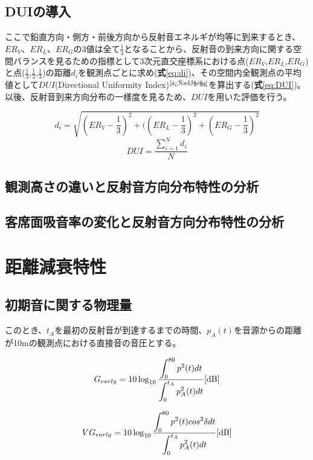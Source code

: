 \subsection{DUIの導入}
ここで鉛直方向・側方・前後方向から反射音エネルギが均等に到来するとき、$ER_V$、$ER_L$、$ER_G$の3値は全て$\frac{1}{3}$となることから、反射音の到来方向に関する空間バランスを見るための指標として3次元直交座標系における点($ER_V$,$ER_L$,$ER_G$)と点($\frac{1}{3}$,$\frac{1}{3}$,$\frac{1}{3}$)の距離$d_i$を観測点ごとに求め(\textbf{式}\ref{eq:di})、その空間内全観測点の平均値として$DUI$(Directional Uniformity Index)$^{\text{\cite{後期音}}}$を算出する(\textbf{式}\ref{eq:DUI})。以後、反射音到来方向分布の一様度を見るため、$DUI$を用いた評価を行う。

\begin{equation}
  \label{eq:di}
  d_i = \sqrt{\left({ER_V-\frac{1}{3}}\right)^2 + (\left(ER_L-\frac{1}{3}\right)^2 + \left(ER_G-\frac{1}{3}\right)^2} 
\end{equation}
\begin{equation}
    \label{eq:DUI}
    DUI=\frac{\sum_{i=1}^N{d_i}}{N}
\end{equation}

\subsection{観測高さの違いと反射音方向分布特性の分析}

\subsection{客席面吸音率の変化と反射音方向分布特性の分析}


\section{距離減衰特性}
\subsection{初期音に関する物理量}

このとき、$t_A$を最初の反射音が到達するまでの時間、$p_A(t)$を音源からの距離が10mの観測点における直接音の音圧とする。

\begin{equation}
  \label{eq:}
  G_{early} = 10\log_{10}{\frac{\displaystyle\int_0^{80}p^2(t)dt}{\displaystyle\int_0^{t_A}p_{A}^2(t)dt}} \textrm{[dB]}
\end{equation}

\begin{equation}
  \label{eq:}
  VG_{early} = 10\log_{10}{\frac{\displaystyle\int_0^{80}p^2(t)cos^2{\delta}dt}{\displaystyle\int_0^{t_A}p_{A}^2(t)dt}} \textrm{[dB]}
\end{equation}

